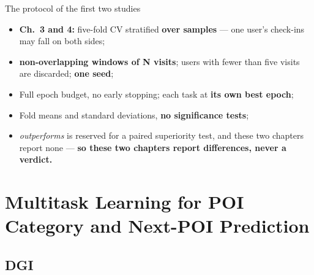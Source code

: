 \documentclass{beamer}
\begin{document}
\begin{frame}{The protocol of the first two studies}
    \begin{itemize}\setlength{\itemsep}{1.6ex}
        \item \textbf{Ch.~3 and 4:} five-fold CV stratified \textbf{over samples} ---
              \alert{one user's check-ins may fall on both sides};
        \item \textbf{non-overlapping windows of N visits}; users with fewer than five visits are
              discarded; \textbf{one seed};
        \item Full epoch budget, no early stopping; each task at \textbf{its own best epoch};
        \item Fold means and standard deviations, \textbf{no significance tests};
        \item \emph{outperforms} is reserved for a paired superiority test, and these two chapters
              report none --- \textbf{so these two chapters report differences, never a verdict.}
    \end{itemize}
\end{frame}

\section[MTLnet]{Multitask Learning for POI Category and Next-POI Prediction}


\subsection{DGI}
\end{document}
